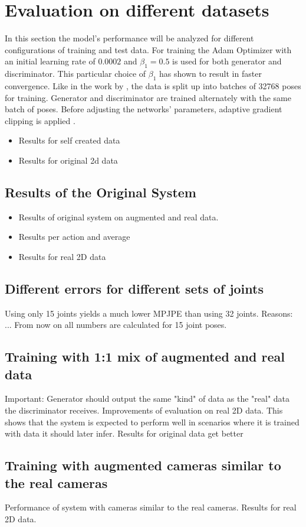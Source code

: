 \section{Evaluation on different datasets}
\label{sec:evaluation}


In this section the model's performance will be analyzed for different configurations of training and test data.
For training the Adam Optimizer \cite{kingma17} with an initial learning rate of $0.0002$ and $\beta_1 = 0.5$ is used for both generator and discriminator.
This particular choice of $\beta_1$ has shown to result in faster convergence.
Like in the work by \citet{drover18}, the data is split up into batches of 32768 poses for training.
Generator and discriminator are trained alternately with the same batch of poses.
Before adjusting the networks' parameters, adaptive gradient clipping is applied  \cite[Section~3.2.1]{chorowski14}.

\begin{itemize}
	\item Results for self created data
	\item Results for original 2d data
\end{itemize}

\subsection{Results of the Original System}
\begin{itemize}
	\item Results of original system on augmented and real data.
	\item Results per action and average
	\item Results for real 2D data
\end{itemize}


\subsection{Different errors for different sets of joints}
Using only 15 joints yields a much lower MPJPE than using 32 joints. Reasons: ...	
From now on all numbers are calculated for 15 joint poses.

\subsection{Training with 1:1 mix of augmented and real data}
Important: Generator should output the same "kind" of data as the "real" data the discriminator receives.
Improvements of evaluation on real 2D data. 
This shows that the system is expected to perform well in scenarios where it is trained with data it should later infer.
Results for original data get better



\subsection{Training with augmented cameras similar to the real cameras}
Performance of system with cameras similar to the real cameras.
Results for real 2D data.